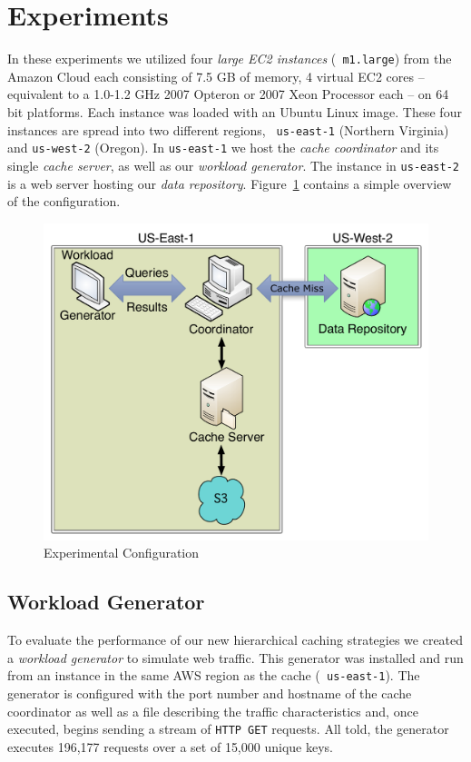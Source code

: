 \section{Experiments} %
\label{sec:experiments_storage}
In these experiments we utilized four \emph{large EC2 instances} ({\tt
m1.large}) from the Amazon Cloud each consisting of 7.5 GB of memory, 4 virtual
EC2 cores -- equivalent to a 1.0-1.2 GHz 2007 Opteron or 2007 Xeon Processor
each -- on 64 bit platforms.  Each instance was loaded with an Ubuntu Linux
image. These four instances are spread into two different regions, {\tt
us-east-1} (Northern Virginia) and {\tt us-west-2}
(Oregon)\cite{amazonEC2locations}. In {\tt us-east-1} we host the
\emph{cache coordinator} and its single \emph{cache server}, as well as our
\emph{workload generator}. The instance in {\tt us-east-2} is a web server
hosting our \emph{data repository}. Figure~\ref{fig:ca-experiment-config}
contains a simple overview of the configuration.

\begin{figure}
\begin{center}
\includegraphics[scale=0.5]{figures/hierarchy-experiment-config.pdf}
\end{center}
\caption{Experimental Configuration}
\label{fig:ca-experiment-config}
\end{figure}

\subsection{Workload Generator} %
\label{sub:work_generator}
To evaluate the performance of our new hierarchical caching strategies we
created a \emph{workload generator} to simulate web traffic. This generator was
installed and run from an instance in the same AWS region as the cache ({\tt
us-east-1}). The generator is configured with the port number and hostname of
the cache coordinator as well as a file describing the traffic characteristics
and, once executed, begins sending a stream of {\tt HTTP GET} requests. All
told, the generator executes 196,177 requests over a set of 15,000 unique
keys.

